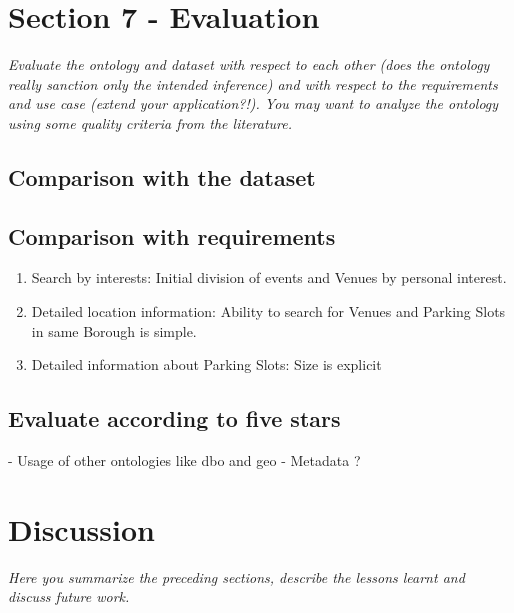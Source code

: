 \documentclass[runningheads,a4paper]{../../StyleFiles/llncs}
\begin{document}
\section{Section 7 - Evaluation}
\textit{Evaluate the ontology and dataset with respect to each other (does the ontology really sanction only the intended inference) and with respect to the requirements and use case (extend your application?!). You may want to analyze the ontology using some quality criteria from the literature.}

\subsection{Comparison with the dataset}

\subsection{Comparison with requirements}
\begin{enumerate}
	\item Search by interests: Initial division of events and Venues by personal interest.
	\item Detailed location information: Ability to search for Venues and Parking Slots in same Borough is simple.
	\item Detailed information about Parking Slots: Size is explicit
\end{enumerate}

\subsection{Evaluate according to five stars}
- Usage of other ontologies like dbo and geo
- Metadata ?

\section{Discussion}
\textit{Here you summarize the preceding sections, describe the lessons learnt and discuss future work.}





\end{document}
